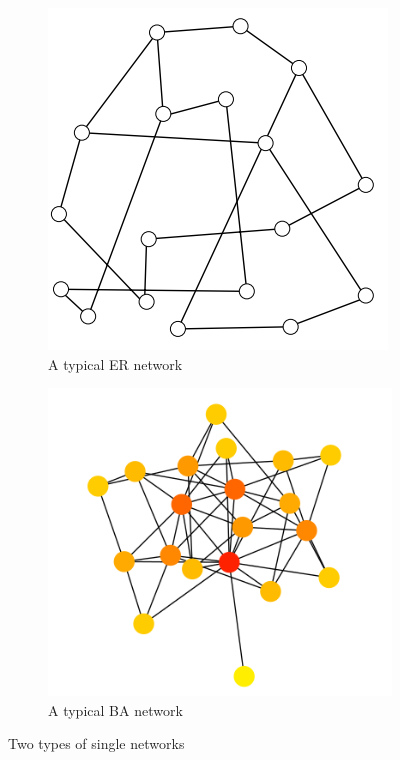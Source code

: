 \documentclass[11pt]{article}
\begin{document}
\begin{figure}
    \centering
    \begin{subfigure}[b]{0.3\textwidth}
        \includegraphics[width=\textwidth]{ER.png}
        \caption{A typical ER network}
        \label{fig:er}
    \end{subfigure}
    \qquad
    \begin{subfigure}[b]{0.3\textwidth}
        \includegraphics[width=\textwidth]{Barabasi_albert_graph.png}
        \caption{A typical BA network}
        \label{fig:ba}
    \end{subfigure}
    \caption{Two types of single networks}\label{fig:networks}
\end{figure}
\end{document}
